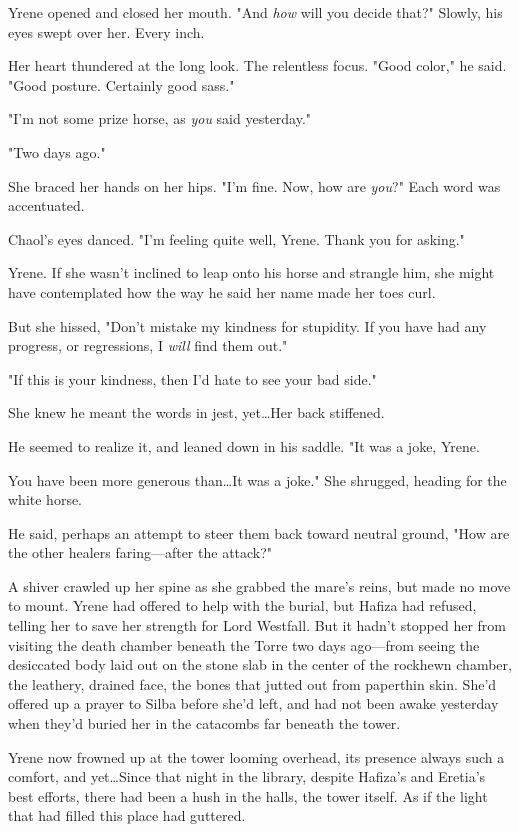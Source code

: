Yrene opened and closed her mouth.
"And \emph{how} will you decide that?"
Slowly, his eyes swept over her.
Every inch.

Her heart thundered at the long look.
The relentless focus.
"Good color," he said.
"Good posture.
Certainly good sass."

"I'm not some prize horse, as \emph{you} said yesterday."

"Two days ago."

She braced her hands on her hips.
"I'm fine.
Now, how are \emph{you}?"
Each word was accentuated.

Chaol's eyes danced.
"I'm feeling quite well, Yrene.
Thank you for asking."

Yrene.
If she wasn't inclined to leap onto his horse and strangle him, she might have contemplated how the way he said her name made her toes curl.

But she hissed, "Don't mistake my kindness for stupidity.
If you have had any progress, or regressions, I \emph{will} find them out."

"If this is your kindness, then I'd hate to see your bad side."

She knew he meant the words in jest, yet\ldots Her back stiffened.

He seemed to realize it, and leaned down in his saddle.
"It was a joke, Yrene.

You have been more generous than\ldots It was a joke."
She shrugged, heading for the white horse.

He said, perhaps an attempt to steer them back toward neutral ground, "How are the other healers faring---after the attack?"

A shiver crawled up her spine as she grabbed the mare's reins, but made no move to mount.
Yrene had offered to help with the burial, but Hafiza had refused, telling her to save her strength for Lord Westfall.
But it hadn't stopped her from visiting the death chamber beneath the Torre two days ago---from seeing the desiccated body laid out on the stone slab in the center of the rockhewn chamber, the leathery, drained face, the bones that jutted out from paperthin skin.
She'd offered up a prayer to Silba before she'd left, and had not been awake yesterday when they'd buried her in the catacombs far beneath the tower.

Yrene now frowned up at the tower looming overhead, its presence always such a comfort, and yet\ldots Since that night in the library, despite Hafiza's and Eretia's best efforts, there had been a hush in the halls, the tower itself.
As if the light that had filled this place had guttered.

